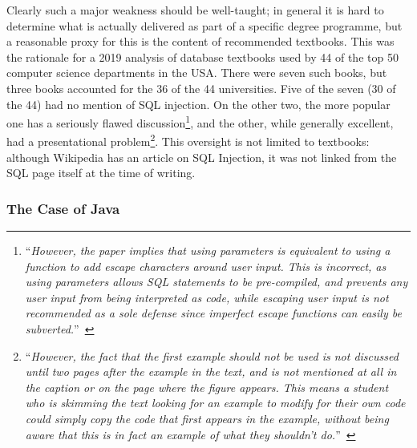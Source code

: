 \documentclass[conference]{IEEEtran}
\begin{document}
Clearly such a major weakness should be well-taught; in general it is hard to determine what is actually delivered as part of a specific degree programme, but a reasonable proxy for this is the content of recommended textbooks. This was the rationale for a 2019 analysis of database textbooks used by 44 of the top 50 computer science departments in the USA\cite{Drop2019}.  There were seven such books, but three books accounted for the 36 of the 44 universities. Five of the seven (30 of the 44) had no mention of SQL injection. On the other two, the more popular one has a seriously flawed discussion\footnote{``{\emph{However, the paper implies that using parameters is equivalent to using a function to add escape characters around user input. This is incorrect, as using parameters allows SQL statements to be pre-compiled, and prevents any user input from being interpreted as code, while escaping user input is not recommended as a sole defense since imperfect escape functions can easily be subverted.}}''~\cite{Drop2019}}, and the other, while generally excellent, had a presentational problem\footnote{``{\emph{However, the fact that the first example should not be used is not discussed until two pages after the example in the text, and is not mentioned at all in the caption or on the page where the figure appears. This means a student who is skimming the text looking for an example to modify for their own code could simply copy the code that first appears in the example, without being aware that this is in fact an example of what they shouldn't do.}}''~\cite{Drop2019}}. This oversight is not limited to textbooks: although Wikipedia has an article on SQL Injection, it was not linked from the SQL page itself at the time of writing.%

\subsubsection{The Case of Java}\label{sec:Java}
\end{document}
